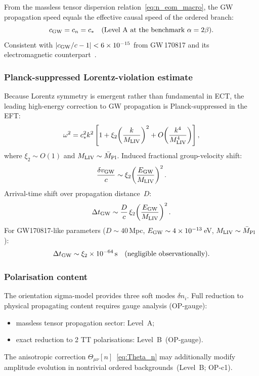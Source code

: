 \documentclass[11pt,a4paper]{article}
\numberwithin{equation}{section}
\begin{document}
From the massless tensor dispersion relation~\eqref{eq:n_eom_macro},
the GW propagation speed equals the effective causal speed of the
ordered branch:
\begin{equation}
  \label{eq:cgw}
  c_{\rm GW}=c_n=c_*
  \quad\text{(Level~A at the benchmark }\alpha=2\beta\text{)}.
\end{equation}
Consistent with $|c_{\rm GW}/c-1|<6\times10^{-15}$ from GW\,170817
and its electromagnetic counterpart~\cite{LIGO_Virgo_GW170817_2017}.

\subsubsection*{Planck-suppressed Lorentz-violation estimate}

Because Lorentz symmetry is emergent rather than fundamental in ECT,
the leading high-energy correction to GW propagation is
Planck-suppressed in the EFT:
\begin{equation}
  \label{eq:gw_liv_dispersion}
  \omega^2 = c_*^2 k^2
  \left[1+\xi_2\!\left(\frac{k}{M_{\rm LIV}}\right)^2
  + O\!\left(\frac{k^4}{M_{\rm LIV}^4}\right)\right],
\end{equation}
where $\xi_2\sim O(1)$ and $M_{\rm LIV}\sim\bar M_{\rm Pl}$.
Induced fractional group-velocity shift:
\begin{equation}
  \label{eq:gw_velocity_shift}
  \frac{\delta v_{\rm GW}}{c}
  \sim \xi_2\!\left(\frac{E_{\rm GW}}{M_{\rm LIV}}\right)^2.
\end{equation}
Arrival-time shift over propagation distance~$D$:
\begin{equation}
  \label{eq:LIV_gw}
  \Delta t_{\rm GW}
  \sim \frac{D}{c}\,\xi_2
    \!\left(\frac{E_{\rm GW}}{M_{\rm LIV}}\right)^2.
\end{equation}
For GW170817-like parameters ($D\sim40$\,Mpc,
$E_{\rm GW}\sim4\times10^{-13}$\,eV,
$M_{\rm LIV}\sim\bar M_{\rm Pl}$):
\begin{equation}
  \label{eq:gw_liv_numeric}
  \Delta t_{\rm GW}\sim\xi_2\times10^{-64}\,\text{s}
  \quad\text{(negligible observationally)}.
\end{equation}

\subsubsection*{Polarisation content}

The orientation sigma-model provides three soft modes $\delta n_i$.
Full reduction to physical propagating content requires gauge analysis
(OP-gauge):
\begin{itemize}
  \item massless tensor propagation sector: Level~A;
  \item exact reduction to 2 TT polarisations: Level~B~(OP-gauge).
\end{itemize}
The anisotropic correction $\Theta_{\mu\nu}[n]$~\eqref{eq:Theta_n}
may additionally modify amplitude evolution in nontrivial ordered
backgrounds~(Level~B; OP-c1).
\end{document}
